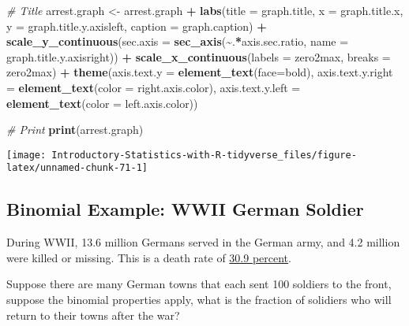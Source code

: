\documentclass[
]{book}
\newenvironment{Shaded}{\begin{snugshade}}{\end{snugshade}}
\newcommand{\CommentTok}[1]{\textcolor[rgb]{0.56,0.35,0.01}{\textit{#1}}}
\newcommand{\DataTypeTok}[1]{\textcolor[rgb]{0.13,0.29,0.53}{#1}}
\newcommand{\KeywordTok}[1]{\textcolor[rgb]{0.13,0.29,0.53}{\textbf{#1}}}
\newcommand{\NormalTok}[1]{#1}
\newcommand{\OperatorTok}[1]{\textcolor[rgb]{0.81,0.36,0.00}{\textbf{#1}}}
\newcommand{\StringTok}[1]{\textcolor[rgb]{0.31,0.60,0.02}{#1}}
\begin{document}
\begin{Shaded}
\begin{Highlighting}[]
\CommentTok{\# Title}
\NormalTok{arrest.graph \textless{}{-}}\StringTok{ }\NormalTok{arrest.graph }\OperatorTok{+}
\StringTok{    }\KeywordTok{labs}\NormalTok{(}\DataTypeTok{title =}\NormalTok{ graph.title,}
         \DataTypeTok{x =}\NormalTok{ graph.title.x, }\DataTypeTok{y =}\NormalTok{ graph.title.y.axisleft,}
         \DataTypeTok{caption =}\NormalTok{ graph.caption) }\OperatorTok{+}
\StringTok{    }\KeywordTok{scale\_y\_continuous}\NormalTok{(}\DataTypeTok{sec.axis =}
                       \KeywordTok{sec\_axis}\NormalTok{(}\OperatorTok{\textasciitilde{}}\NormalTok{.}\OperatorTok{*}\NormalTok{axis.sec.ratio, }\DataTypeTok{name =}\NormalTok{ graph.title.y.axisright)) }\OperatorTok{+}
\StringTok{    }\KeywordTok{scale\_x\_continuous}\NormalTok{(}\DataTypeTok{labels =}\NormalTok{ zero2max, }\DataTypeTok{breaks =}\NormalTok{ zero2max) }\OperatorTok{+}
\StringTok{    }\KeywordTok{theme}\NormalTok{(}\DataTypeTok{axis.text.y =} \KeywordTok{element\_text}\NormalTok{(}\DataTypeTok{face=}\StringTok{\textquotesingle{}bold\textquotesingle{}}\NormalTok{),}
          \DataTypeTok{axis.text.y.right =} \KeywordTok{element\_text}\NormalTok{(}\DataTypeTok{color =}\NormalTok{ right.axis.color),}
          \DataTypeTok{axis.text.y.left =} \KeywordTok{element\_text}\NormalTok{(}\DataTypeTok{color =}\NormalTok{ left.axis.color))}

\CommentTok{\# Print}
\KeywordTok{print}\NormalTok{(arrest.graph)}
\end{Highlighting}
\end{Shaded}

\begin{center}\texttt{[image: Introductory-Statistics-with-R-tidyverse\_files/figure-latex/unnamed-chunk-71-1]} \end{center}

\hypertarget{binomial-example-wwii-german-soldier}{%
\subsection{Binomial Example: WWII German Soldier}\label{binomial-example-wwii-german-soldier}}

During WWII, 13.6 million Germans served in the German army, and 4.2 million were killed or missing. This is a death rate of \href{https://en.wikipedia.org/wiki/World_War_II_casualties\#Military_casualties_by_branch_of_service}{30.9 percent}.

Suppose there are many German towns that each sent 100 soldiers to the front, suppose the binomial properties apply, what is the fraction of solidiers who will return to their towns after the war?
\end{document}
